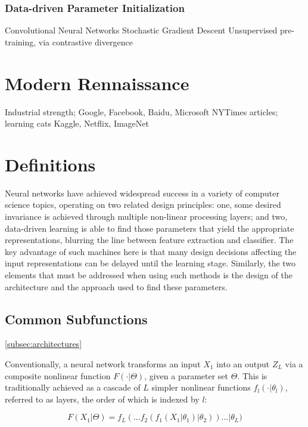 \subsubsection{Data-driven Parameter Initialization}
\label{subsec:perceptrons}

Convolutional Neural Networks
Stochastic Gradient Descent
Unsupervised pre-training, via contrastive divergence




\section{Modern Rennaissance}
\label{sec:rennaissance}

Industrial strength; Google, Facebook, Baidu, Microsoft
NYTimes articles; learning cats
Kaggle, Netflix, ImageNet



\section{Definitions}
\label{sec:example}

Neural networks have achieved widespread success in a variety of computer science topics, operating on two related design principles:
one, some desired invariance is achieved through multiple non-linear processing layers;
and two, data-driven learning is able to find those parameters that yield the appropriate representations, blurring the line between feature extraction and classifier.
The key advantage of such machines here is that many design decisions affecting the input representations can be delayed until the learning stage.
Similarly, the two elements that must be addressed when using such methods is the design of the architecture and the approach used to find these parameters.


\subsection{Common Subfunctions}
\ref{subsec:architectures}

Conventionally, a neural network transforms an input $X_{1}$ into an output $Z_{L}$ via a composite nonlinear function $F(\cdot \vert \Theta)$, given a parameter set $\Theta$.
This is traditionally achieved as a cascade of $L$ simpler nonlinear functions $f_l(\cdot \vert \theta_l)$, referred to as layers, the order of which is indexed by $l$:

\begin{equation}
\label{eq:layers}
F(X_{1} \vert \Theta) = f_{L}(  ... f_2(f_1(X_{1} \vert \theta_1) \vert \theta_2) ) ... \vert \theta_{L})
\end{equation}

